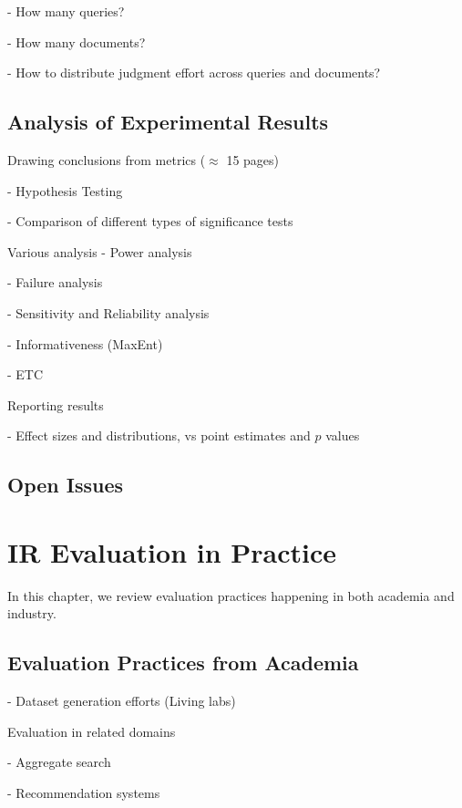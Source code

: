 \documentclass[openany]{now} %
\newcommand{\newpar}{\bigskip\noindent}
\begin{document}
- How many queries? \cite{Sakai:2014}

- How many documents? \cite{CarterettePFK09}

- How to distribute judgment effort across queries and documents? \cite{CarterettePKAA09, YilmazR09}


\section{Analysis of Experimental Results}

Drawing conclusions from metrics (\ensuremath{\approx} 15 pages)

- Hypothesis Testing \cite{Dincer:2014}

- Comparison of different types of significance tests \cite{SmuckerAC09}

\newpar
Various analysis
- Power analysis \cite{Sakai:2014}

- Failure analysis

- Sensitivity and Reliability analysis \cite{Urbano:2013} 

- Informativeness (MaxEnt) \cite{AslamYP05}

- ETC \cite{Bron:2013} \cite{Boytsov:2013}  \cite{Robertson:2012}

\newpar
Reporting results

- Effect sizes and distributions, vs point estimates and $p$ values

\section{Open Issues}

\chapter{IR Evaluation in Practice}

In this chapter, we review evaluation practices happening in both academia and industry.

\section{Evaluation Practices from Academia}

- Dataset generation efforts (Living labs)


\newpar
Evaluation in related domains

- Aggregate search \cite{Zhou:2013}

- Recommendation systems \cite{gunawardana2015evaluating}
\end{document}

